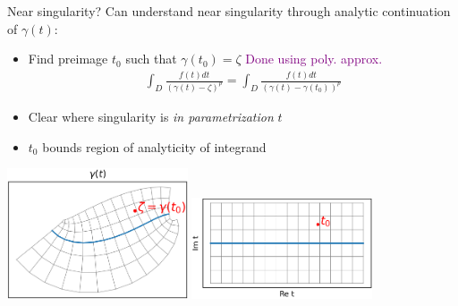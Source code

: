 \documentclass[t]{beamer}
\newcommand{\com}[1]{{\scriptsize \textcolor{purple}{#1}}}      %
\newcommand{\sg}{\vspace{1ex}}
\begin{document}
\begin{frame}{Near singularity?}
  Can understand near singularity through analytic
  continuation of $\gamma(t)$:

  \sg
  \begin{itemize}
  \item   Find preimage $t_0$ such that $\gamma(t_0) = \zeta$ \hfill\com{Done using poly. approx.}
  \begin{align}
    \int_D \frac{f(t) dt }{(\gamma(t)-\zeta)^p}
    = \int_D \frac{f(t) dt }{(\gamma(t)-\gamma(t_0))^p} 
  \end{align}
  \pause
  \item Clear where singularity is \emph{in parametrization} $t$
  \item $t_0$ bounds region of analyticity of integrand
  \end{itemize}
  \begin{center}
    \includegraphics[width=0.4\textwidth]{fig/complexification_gamma_case2.png}
    \hspace{1em} 
    \includegraphics[width=0.4\textwidth]{fig/complexification_t_case2.png}
  \end{center}
\end{frame}
\end{document}
